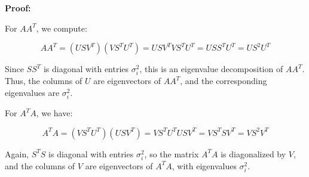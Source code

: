 \textbf{Proof:}

For \( AA^T \), we compute:

\[
    AA^T = (U S V^T)(V S^T U^T) = U S V^T V S^T U^T = U S S^T U^T = U S^2 U^T
\]

Since \( SS^T \) is diagonal with entries \( \sigma_i^2 \), this is an eigenvalue decomposition of 
\( AA^T \). Thus, the columns of \( U \) are eigenvectors of \( AA^T \), and the corresponding eigenvalues 
are \( \sigma_i^2 \).

For \( A^T A \), we have:

\[
    A^T A = (V S^T U^T)(U S V^T) = V S^T U^T U S V^T = V S^T S V^T = V S^2 V^T
\]

Again, \( S^T S \) is diagonal with entries \( \sigma_i^2 \), so the matrix \( A^T A \) is diagonalized 
by \( V \), and the columns of \( V \) are eigenvectors of \( A^T A \), with eigenvalues \( \sigma_i^2 \).

\QED


